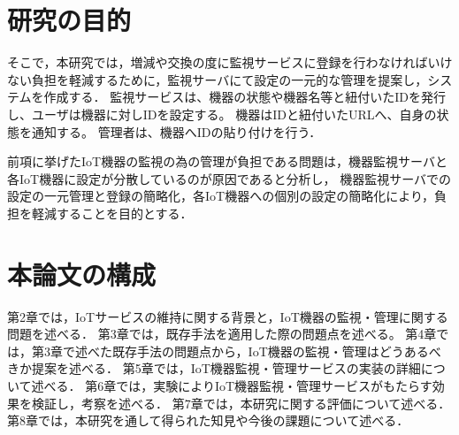 \section{研究の目的}
そこで，本研究では，増減や交換の度に監視サービスに登録を行わなければいけない負担を軽減するために，監視サーバにて設定の一元的な管理を提案し，システムを作成する．
監視サービスは、機器の状態や機器名等と紐付いたIDを発行し、ユーザは機器に対しIDを設定する。
機器はIDと紐付いたURLへ、自身の状態を通知する。
管理者は、機器へIDの貼り付けを行う．
\medskip

前項に挙げたIoT機器の監視の為の管理が負担である問題は，機器監視サーバと各IoT機器に設定が分散しているのが原因であると分析し，
機器監視サーバでの設定の一元管理と登録の簡略化，各IoT機器への個別の設定の簡略化により，負担を軽減することを目的とする．

\section{本論文の構成}
第2章では，IoTサービスの維持に関する背景と，IoT機器の監視・管理に関する問題を述べる．
第3章では，既存手法を適用した際の問題点を述べる。
第4章では，第3章で述べた既存手法の問題点から，IoT機器の監視・管理はどうあるべきか提案を述べる．
第5章では，IoT機器監視・管理サービスの実装の詳細について述べる．
第6章では，実験によりIoT機器監視・管理サービスがもたらす効果を検証し，考察を述べる．
第7章では，本研究に関する評価について述べる．
第8章では，本研究を通して得られた知見や今後の課題について述べる．


